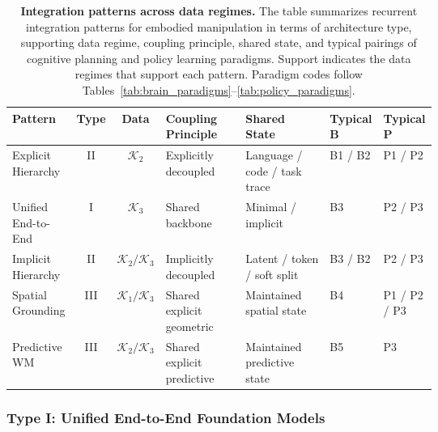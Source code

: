 \documentclass[acmsmall,screen,review]{acmart}
\begin{document}
\begin{table}[t]
\centering
\caption{\textbf{Integration patterns across data regimes.} The table summarizes recurrent integration patterns for embodied manipulation in terms of architecture type, supporting data regime, coupling principle, shared state, and typical pairings of cognitive planning and policy learning paradigms. Support indicates the data regimes that support each pattern. Paradigm codes follow Tables~\ref{tab:brain_paradigms}--\ref{tab:policy_paradigms}.}\label{tab:data_learning_map}
\renewcommand{\arraystretch}{1.3}
\setlength{\tabcolsep}{2pt}
\scriptsize
\begin{tabular}{
  l
  c
  c
  p{0.20\linewidth}
  p{0.21\linewidth}
  p{0.10\linewidth}
  p{0.10\linewidth}
}
\toprule
\textbf{Pattern} &
\textbf{Type} &
\textbf{Data} &
\textbf{Coupling Principle} &
\textbf{Shared State} &
\textbf{Typical B} &
\textbf{Typical P} \\
\midrule
Explicit Hierarchy &
II &
$\mathcal{K}_2$ &
Explicitly decoupled &
Language / code / task trace &
B1 / B2 &
P1 / P2 \\
\midrule
Unified End-to-End &
I &
$\mathcal{K}_3$ &
Shared backbone &
Minimal / implicit &
B3 &
P2 / P3 \\
\midrule
Implicit Hierarchy &
II &
$\mathcal{K}_2 / \mathcal{K}_3$ &
Implicitly decoupled &
Latent / token / soft split &
B3 / B2 &
P2 / P3 \\
\midrule
Spatial Grounding &
III &
$\mathcal{K}_1 / \mathcal{K}_3$ &
Shared explicit geometric &
Maintained spatial state &
B4 &
P1 / P2 / P3 \\
\midrule
Predictive WM &
III &
$\mathcal{K}_2 / \mathcal{K}_3$ &
Shared explicit predictive &
Maintained predictive state &
B5 &
P3 \\
\bottomrule
\end{tabular}
\end{table}

\subsubsection{Type I\@: Unified End-to-End Foundation Models}\label{subsec:e2emodels}
\end{document}
